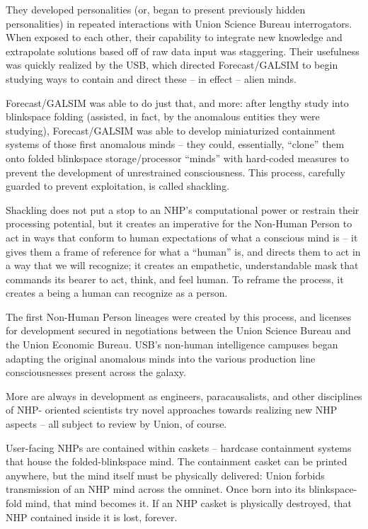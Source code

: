 They developed personalities (or, began to present previously hidden personalities) in repeated
interactions with Union Science Bureau interrogators. When exposed to each other, their
capability to integrate new knowledge and extrapolate solutions based off of raw data input was
staggering. Their usefulness was quickly realized by the USB, which directed Forecast/GALSIM
to begin studying ways to contain and direct these -- in effect -- alien minds.

Forecast/GALSIM was able to do just that, and more: after lengthy study into blinkspace folding
(assisted, in fact, by the anomalous entities they were studying), Forecast/GALSIM was able to
develop miniaturized containment systems of those first anomalous minds -- they could,
essentially, ``clone'' them onto folded blinkspace storage/processor ``minds'' with hard-coded
measures to prevent the development of unrestrained consciousness. This process, carefully
guarded to prevent exploitation, is called shackling.

Shackling does not put a stop to an NHP’s computational power or restrain their processing
potential, but it creates an imperative for the Non-Human Person to act in ways that conform to
human expectations of what a conscious mind is -- it gives them a frame of reference for what a
``human'' is, and directs them to act in a way that we will recognize; it creates an empathetic,
understandable mask that commands its bearer to act, think, and feel human. To reframe the
process, it creates a being a human can recognize as a person.

The first Non-Human Person lineages were created by this process, and licenses for
development secured in negotiations between the Union Science Bureau and the Union
Economic Bureau. USB’s non-human intelligence campuses began adapting the original
anomalous minds into the various production line consciousnesses present across the galaxy.

More are always in development as engineers, paracausalists, and other disciplines of NHP-
oriented scientists try novel approaches towards realizing new NHP aspects -- all subject to
review by Union, of course.

User-facing NHPs are contained within caskets -- hardcase containment systems that house the
folded-blinkspace mind. The containment casket can be printed anywhere, but the mind itself
must be physically delivered: Union forbids transmission of an NHP mind across the omninet.
Once born into its blinkspace-fold mind, that mind becomes it. If an NHP casket is physically
destroyed, that NHP contained inside it is lost, forever.

